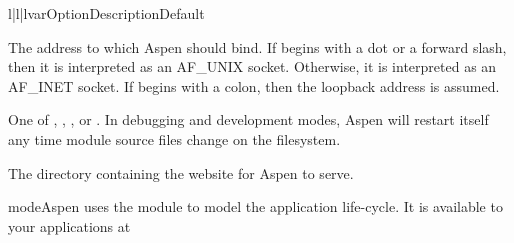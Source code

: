 \begin{tableiii}{l|l|l}{var}{Option}{Description}{Default}

    {The address to which Aspen should bind. If  begins
    with a dot or a forward slash, then it is interpreted as an AF_UNIX socket.
    Otherwise, it is interpreted as an AF_INET socket. If  begins
    with a colon, then the loopback address is assumed.} {}


    {One of , , , or
    . In debugging and development modes, Aspen will restart
    itself any time module source files change on the filesystem.}
    {}

    {The directory containing the website for Aspen to serve.}
    {}


\end{tableiii}

\begin{seealso}

{mode}{Aspen uses the  module to model the application life-cycle.
It is available to your applications at }

\end{seealso}



